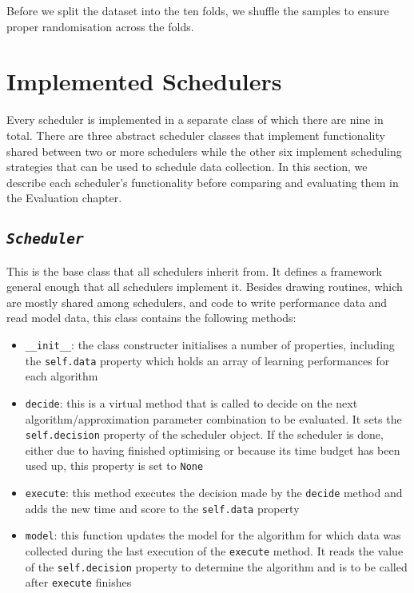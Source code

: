 \documentclass[a4paper,12pt,twoside,openright]{report}
\begin{document}

Before we split the dataset into the ten folds, we shuffle the samples to ensure proper randomisation across the folds. 













\section{Implemented Schedulers}

Every scheduler is implemented in a separate class of which there are nine in total. There are three abstract scheduler classes that implement functionality shared between two or more schedulers while the other six implement scheduling strategies that can be used to schedule data collection. In this section, we describe each scheduler's functionality before comparing and evaluating them in the Evaluation chapter.

\subsection{\texttt{\textit{Scheduler}}}
This is the base class that all schedulers inherit from. It defines a framework general enough that all schedulers implement it. Besides drawing routines, which are mostly shared among schedulers, and code to write performance data and read model data, this class contains the following methods:

\begin{itemize}
\item \texttt{\_\_init\_\_}: the class constructer initialises a number of properties, including the \texttt{self.data} property which holds an array of learning performances for each algorithm
\item \texttt{decide}: this is a virtual method that is called to decide on the next algorithm/approximation parameter combination to be evaluated. It sets the \texttt{self.decision} property of the scheduler object. If the scheduler is done, either due to having finished optimising or because its time budget has been used up, this property is set to \texttt{None}
\item \texttt{execute}: this method executes the decision made by the \texttt{decide} method and adds the new time and score to the \texttt{self.data} property
\item \texttt{model}: this function updates the model for the algorithm for which data was collected during the last execution of the \texttt{execute} method. It reads the value of the \texttt{self.decision} property to determine the algorithm and is to be called after \texttt{execute} finishes
\end{itemize}
\end{document}
